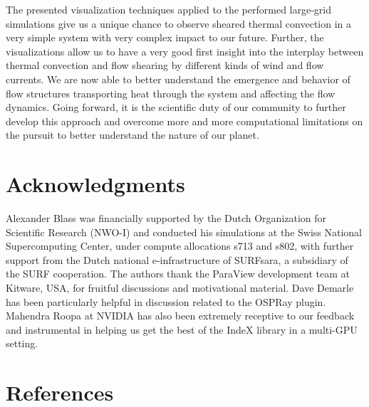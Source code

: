 \documentclass[final,5p,times,twocolumn]{elsarticle}
\begin{document}
The presented visualization techniques applied to the performed large-grid simulations give us a unique chance to observe sheared thermal convection in a very simple system with very complex impact to our future. Further, the visualizations allow us to have a very good first insight into the interplay between thermal convection and flow shearing by different kinds of wind and flow currents. We are now able to better understand the emergence and behavior of flow structures transporting heat through the system and affecting the flow dynamics. Going forward, it is the scientific duty of our community to further develop this approach and overcome more and more computational limitations on the pursuit to better understand the nature of our planet.  




\section*{Acknowledgments}

Alexander Blass was financially supported by the Dutch Organization for Scientific Research (NWO-I) and conducted his simulations at the Swiss National Supercomputing Center, under compute allocations s713 and s802, with further support from the Dutch national e-infrastructure of SURFsara, a subsidiary of the SURF cooperation. The authors thank the ParaView development team at Kitware, USA, for fruitful discussions and motivational material. Dave Demarle has been particularly helpful in discussion related to the OSPRay plugin. Mahendra Roopa ‎at NVIDIA has also been extremely receptive to our feedback and instrumental in helping us get the best of the IndeX library in a multi-GPU setting.

\section*{References}
 

\end{document}
